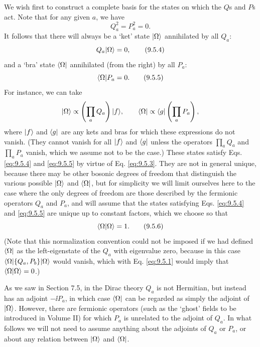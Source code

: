 We wish first to construct a complete basis for the states on which the $Q$s
and $P$s act. Note that for any given $a$, we have
\begin{equation}
Q_a^2=P_a^2=0.
\tag{9.5.3}\label{eq:9.5.3}
\end{equation}
It follows that there will always be a `ket' state $\lvert \Omega\rangle$ annihilated
by all $Q_a$:
\begin{equation}
Q_a\lvert \Omega\rangle=0,
\tag{9.5.4}\label{eq:9.5.4}
\end{equation}
and a `bra' state $\langle \Omega\rvert$ annihilated (from the right) by all $P_a$:
\begin{equation}
\langle \Omega\rvert P_a=0.
\tag{9.5.5}\label{eq:9.5.5}
\end{equation}
For instance, we can take
\[
\lvert \Omega\rangle\propto\left(\prod_a Q_a\right)\lvert f\rangle,
\qquad
\langle \Omega\rvert\propto\langle g\rvert\left(\prod_a P_a\right),
\]
where $\lvert f\rangle$ and $\langle g\rvert$ are any kets and bras for which these expressions
do not vanish. (They cannot vanish for all $\lvert f\rangle$ and $\langle g\rvert$ unless the
operators $\prod_aQ_a$ and $\prod_aP_a$ vanish, which we assume not to be the
case.) These states satisfy Eqs. \eqref{eq:9.5.4} and \eqref{eq:9.5.5} by virtue of Eq. \eqref{eq:9.5.3}.
They are not in general unique, because there may be other bosonic degrees of
freedom that distinguish the various possible $\lvert \Omega\rangle$ and
$\langle \Omega\rvert$, but for simplicity we will limit ourselves here to the case
where the only degrees of freedom are those described by the fermionic
operators $Q_a$ and $P_a$, and will assume that the states satisfying Eqs.
\eqref{eq:9.5.4} and \eqref{eq:9.5.5} are unique up to constant factors, which we choose so that
\begin{equation}
\langle \Omega | \Omega\rangle=1.
\tag{9.5.6}\label{eq:9.5.6}
\end{equation}
(Note that this normalization convention could not be imposed if we had
defined $\langle \Omega\rvert$ as the left-eigenstate of the $Q_a$ with eigenvalue
zero, because in this case $\langle \Omega\rvert\{Q_a,P_b\}\lvert \Omega\rangle$ would vanish,
which with Eq. \eqref{eq:9.5.1} would imply that $\langle \Omega | \Omega\rangle=0$.)

As we saw in Section 7.5, in the Dirac theory $Q_a$ is not Hermitian, but
instead has an adjoint $-\ii P_a$, in which case $\langle \Omega\rvert$ can be regarded as
simply the adjoint of $\lvert \Omega\rangle$. However, there are fermionic operators
(such as the `ghost' fields to be introduced in Volume II) for which $P_a$ is
unrelated to the adjoint of $Q_a$. In what follows we will not need to assume
anything about the adjoints of $Q_a$ or $P_a$, or about any relation between
$\lvert \Omega\rangle$ and $\langle \Omega\rvert$.


